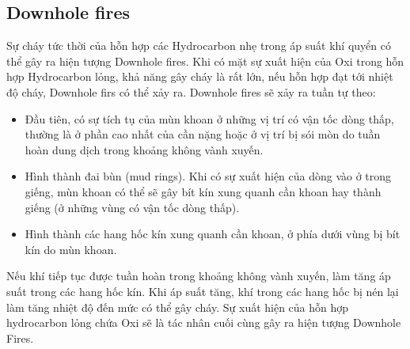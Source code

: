 \documentclass[13pt,a4paper]{article}
\begin{document}
\subsection{Downhole fires}
	Sự cháy tức thời của hỗn hợp các Hydrocarbon nhẹ trong áp suất khí quyển có thể gây ra hiện tượng Downhole fires. Khi có mặt sự xuất hiện của Oxi trong hỗn hợp Hydrocarbon lỏng, khả năng gây cháy là rất lớn, nếu hỗn hợp đạt tới nhiệt độ cháy, Downhole firs có thể xảy ra. Downhole fires sẽ xảy ra tuần tự theo:
	\begin{itemize}
		\item Đầu tiên, có sự tích tụ của mùn khoan ở những vị trí có vận tốc dòng thấp, thường là ở phần cao nhất của cần nặng hoặc ở vị trí bị sói mòn do tuần hoàn dung dịch trong khoảng không vành xuyến.
		\item Hình thành đai bùn (mud rings). Khi có sự xuất hiện của dòng vào ở trong giếng, mùn khoan có thể sẽ gây bít kín xung quanh cần khoan hay thành giếng (ở những vùng có vận tốc dòng thấp).
		\item Hình thành các hang hốc kín xung quanh cần khoan, ở phía dưới vùng bị bít kín do mùn khoan.
	\end{itemize}
	Nếu khí tiếp tục được tuần hoàn trong khoảng không vành xuyến, làm tăng áp suất trong các hang hốc kín. Khi áp suất tăng, khí trong các hang hốc bị nén lại làm tăng nhiệt độ đến mức có thể gây cháy. Sự xuất hiện của hỗn hợp hydrocarbon lỏng chứa Oxi sẽ là tác nhân cuối cùng gây ra hiện tượng Downhole Fires. 
\end{document}
